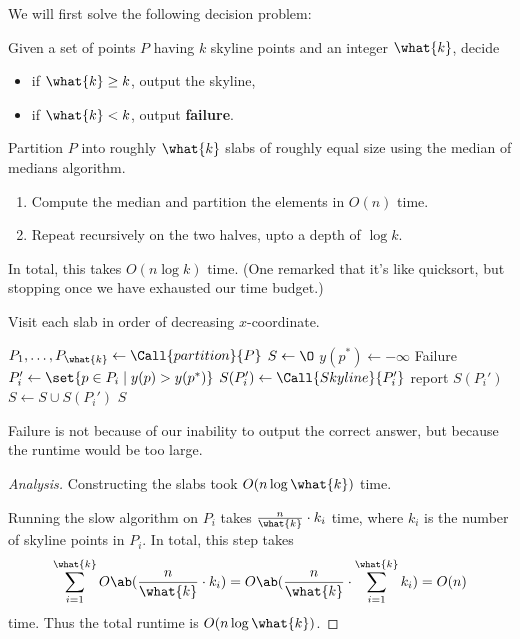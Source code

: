 We will first solve the following decision problem:
\begin{question*}
    Given a set of points $P$ having $k$ skyline points and an integer
    $\what{k}$, decide
    \begin{itemize}
        \item if $\what{k} \ge k$, output the skyline,
        \item if $\what{k} < k$, output \textbf{failure}.
    \end{itemize}
\end{question*}
\begin{solution}
    Partition $P$ into roughly $\what{k}$ slabs of roughly equal size
    using the median of medians algorithm.
    \begin{enumerate}
        \item Compute the median and partition the elements in $O(n)$ time.
        \item Repeat recursively on the two halves, upto a depth of
            $\log k$.
    \end{enumerate}
    In total, this takes $O(n \log k)$ time.
    (One remarked that it's like quicksort, but stopping once we have
    exhausted our time budget.)

    Visit each slab in order of decreasing $x$-coordinate.
    \begin{algo}
            \State $P_1, \ldots, P_{\what{k}} \gets \Call{partition}{P}$
            \State $S \gets \O$
            \State $y(p^*) \gets -\infty$
                    \State \Return Failure
                \Else
                    \State $P_i' \gets \set{p \in P_i \mid y(p) > y(p^*)}$
                    \State $S(P_i') \gets \Call{Skyline}{P_i'}$
                    \State report $S(P_i')$
                    \State $S \gets S \cup S(P_i')$
                \EndIf
            \EndFor
            \State \Return $S$
        \EndFn
    \end{algo}
    Failure is not because of our inability to output the correct answer,
    but because the runtime would be too large.
\end{solution}
\begin{proof}[Analysis]
    Constructing the slabs took $O(n \log \what{k})$ time.

    Running the slow algorithm on $P_i$ takes $\frac{n}{\what{k}} \cdot k_i$
    time, where $k_i$ is the number of skyline points in $P_i$.
    In total, this step takes \[
        \sum_{i=1}^{\what{k}} O\ab(\frac{n}{\what{k}} \cdot k_i)
            = O\ab(\frac{n}{\what{k}} \cdot \sum_{i=1}^{\what{k}} k_i)
            = O(n)
    \] time.
    Thus the total runtime is $O(n \log \what{k})$.
\end{proof}

